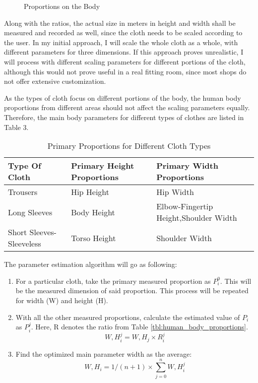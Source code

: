 \begin{figure}[h]
\centerline{}
\caption{Proportions on the Body}
\label{fig:body_proportions}
\end{figure}

Along with the ratios, the actual size in meters in height and width shall be measured and recorded as well, since the cloth needs to be scaled according to the user. In my initial approach, I will scale the whole cloth as a whole, with different parameters for three dimensions. If this approach proves unrealistic, I will process with different scaling parameters for different portions of the cloth, although this would not prove useful in a real fitting room, since most shops do not offer extensive customization.

As the types of cloth focus on different portions of the body, the human body proportions from different areas should not affect the scaling parameters equally. Therefore, the main body parameters for different types of clothes are listed in Table 3.

\begin{table}
\center
\begin{tabular}{ | l | l | l  |}
\hline
\textbf{Type Of Cloth} & \textbf{Primary Height Proportions} & \textbf{Primary Width Proportions}  \\ \hline
Trousers & Hip Height & Hip Width \\ \hline
Long Sleeves & Body Height & Elbow-Fingertip Height,Shoulder Width \\ \hline
Short Sleeves-Sleeveless & Torso Height & Shoulder Width \\ 
\hline
\end{tabular}
\caption{Primary Proportions for Different Cloth Types}
\label{tbl:primary_proportions}
\end{table}

The parameter estimation algorithm will go as following:

\begin{enumerate}
\item For a particular cloth, take the primary measured proportion as $P_i^0$. This will be the measured dimension of said proportion. This process will be repeated for width (W) and height (H).
\item With all the other measured proportions, calculate the estimated value of $P_i$ as $P_i^j$. Here, R denotes the ratio from Table \ref{tbl:human_body_proportions}.
\begin{equation}
W,H_i^j=W,H_j \times R_i^j
\label{eqn:proportion_estimation}
\end{equation}
\item Find the optimized main parameter width as the average:
\begin{equation}
W,H_i=1/(n+1) \times \sum\limits_{j=0}^n W,H_i^j
\label{eqn:optimized_parameter}
\end{equation}
\end{enumerate}

